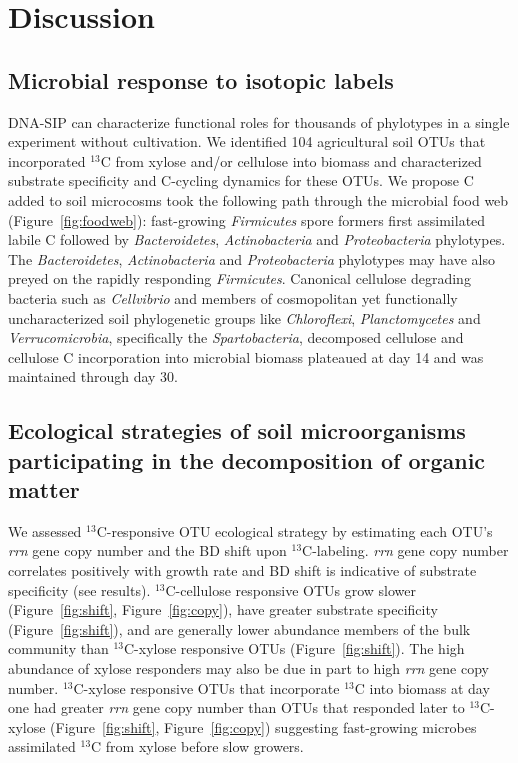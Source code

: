 \section{Discussion} 
\subsection{Microbial response to isotopic labels}
DNA-SIP can characterize functional roles for thousands of phylotypes in
a single experiment without cultivation. We identified 104 agricultural soil
OTUs that incorporated $^{13}$C from xylose and/or
cellulose into biomass and characterized substrate specificity and C-cycling
dynamics for these OTUs. We propose C added to soil microcosms took the
following path through the microbial food web (Figure~\ref{fig:foodweb}):
fast-growing \textit{Firmicutes} spore formers first
assimilated labile C followed by \textit{Bacteroidetes},
\textit{Actinobacteria} and \textit{Proteobacteria} phylotypes. The
\textit{Bacteroidetes}, \textit{Actinobacteria} and \textit{Proteobacteria}
phylotypes may have also preyed on the rapidly responding \textit{Firmicutes}.
Canonical cellulose degrading bacteria such as \textit{Cellvibrio} and
members of cosmopolitan yet functionally uncharacterized soil phylogenetic
groups like \textit{Chloroflexi}, \textit{Planctomycetes} and
\textit{Verrucomicrobia}, specifically the \textit{Spartobacteria}, decomposed
cellulose and cellulose C incorporation into microbial biomass plateaued at day
14 and was maintained through day 30.

\subsection{Ecological strategies of soil microorganisms participating in the
decomposition of organic matter}
We assessed $^{13}$C-responsive OTU ecological strategy by estimating each
OTU's \textit{rrn} gene copy number and the BD shift upon $^{13}$C-labeling.
\textit{rrn} gene copy number correlates positively with growth rate
\citep{11125085} and BD shift is indicative of substrate specificity (see
results). $^{13}$C-cellulose responsive OTUs grow
slower (Figure~\ref{fig:shift}, Figure~\ref{fig:copy}), have greater substrate
specificity (Figure~\ref{fig:shift}), and are generally lower abundance members
of the bulk community than $^{13}$C-xylose responsive OTUs
(Figure~\ref{fig:shift}). The high abundance of xylose responders may also be
due in part to high \textit{rrn} gene copy number. $^{13}$C-xylose responsive
OTUs that incorporate $^{13}$C into biomass at day one had greater \textit{rrn}
gene copy number than OTUs that responded later to $^{13}$C-xylose
(Figure~\ref{fig:shift}, Figure~\ref{fig:copy}) suggesting fast-growing
microbes assimilated $^{13}$C from xylose before slow growers.

